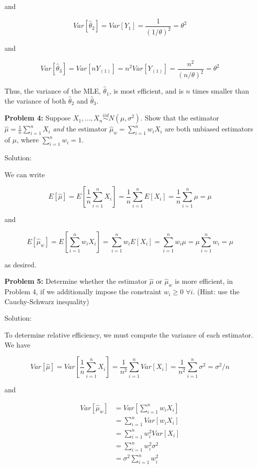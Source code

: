 \documentclass[
  letterpaper,
  DIV=11,
  numbers=noendperiod]{scrreprt}
\begin{document}
and

\[
Var\left[\hat{\theta}_2\right] = Var[Y_1] = \frac{1}{(1/\theta)^2} = \theta^2
\]

and

\[
Var\left[\hat{\theta}_3\right] = Var[nY_{(1)}] = n^2 Var[Y_{(1)}] = \frac{n^2}{(n/\theta)^2} = \theta^2
\]

Thus, the variance of the MLE, \(\hat{\theta}_1\), is most efficient,
and is \(n\) times smaller than the variance of both \(\hat{\theta}_2\)
and \(\hat{\theta}_3\).

\textbf{Problem 4:} Suppose
\(X_1, \dots, X_n \overset{iid}{\sim} N(\mu, \sigma^2)\). Show that the
estimator \(\hat{\mu} = \frac{1}{n} \sum_{i = 1}^n X_i\) \emph{and} the
estimator \(\hat{\mu}_w = \sum_{i = 1}^n w_i X_i\) are both unbiased
estimators of \(\mu\), where \(\sum_{i = 1}^n w_i = 1\).

Solution:

We can write

\[
E[\hat{\mu}] = E\left[ \frac{1}{n} \sum_{i = 1}^n X_i \right] = \frac{1}{n}\sum_{i = 1}^n E[X_i] = \frac{1}{n}\sum_{i = 1}^n \mu = \mu
\]

and

\[
E[\hat{\mu}_w] = E \left[ \sum_{i = 1}^n w_i X_i \right] = \sum_{i = 1}^n w_i E \left[ X_i \right] = \sum_{i = 1}^n w_i \mu = \mu \sum_{i = 1}^n w_i = \mu
\]

as desired.

\textbf{Problem 5:} Determine whether the estimator \(\hat{\mu}\) or
\(\hat{\mu}_w\) is more efficient, in Problem 4, if we additionally
impose the constraint \(w_i \geq 0\) \(\forall i\). (Hint: use the
Cauchy-Schwarz inequality)

Solution:

To determine relative efficiency, we must compute the variance of each
estimator. We have

\[
Var[\hat{\mu}] = Var \left[ \frac{1}{n} \sum_{i = 1}^n X_i \right] = \frac{1}{n^2} \sum_{i = 1}^n Var[X_i] = \frac{1}{n^2} \sum_{i = 1}^n \sigma^2 = \sigma^2 / n
\]

and

\begin{align*}
    Var[\hat{\mu}_w] & =  Var \left[ \sum_{i = 1}^n w_i X_i \right] \\
    & = \sum_{i = 1}^n Var[w_i X_i] \\
    & = \sum_{i = 1}^n w_i^2 Var[X_i] \\
    & = \sum_{i = 1}^n w_i^2  \sigma^2 \\
    & = \sigma^2 \sum_{i = 1}^n w_i^2
\end{align*}
\end{document}
